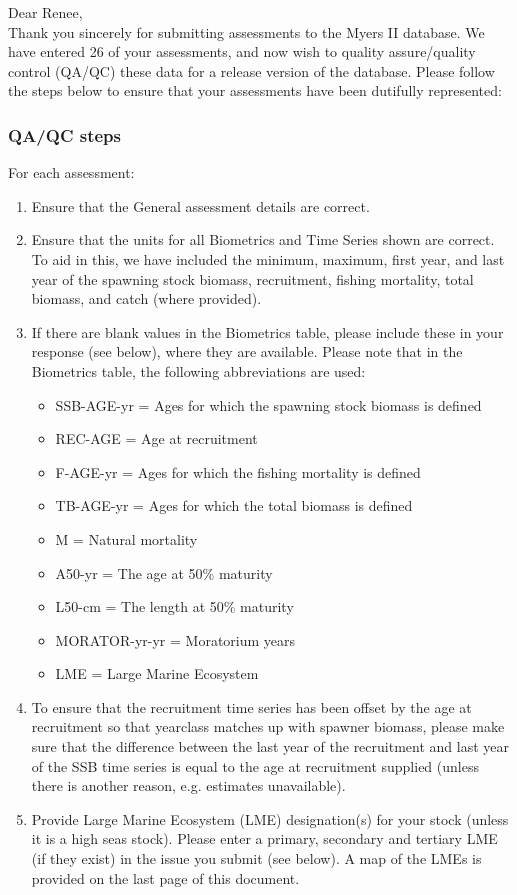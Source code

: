 \documentclass [a4paper, 10pt] {article}
\begin{document}
\noindent Dear Renee,\\

\noindent Thank you sincerely for submitting assessments to the Myers II database. We have entered 26 of your assessments, and now wish to quality assure/quality control (QA/QC) these data for a release version of the database. Please follow the steps below to ensure that your assessments have been dutifully represented:
\subsubsection{QA/QC steps}
For each assessment:
\begin{enumerate}
\item Ensure that the General assessment details are correct.
\item Ensure that the units for all Biometrics and Time Series shown are correct. To aid in this, we have included the minimum, maximum, first year, and last year of the spawning stock biomass, recruitment, fishing mortality, total biomass, and  catch  (where provided). 
\item If there are blank values in the Biometrics table, please include these in your response (see below), where they are available.
Please note that in the Biometrics table, the following abbreviations are used:
\begin{itemize}
\item SSB-AGE-yr  = Ages for which the spawning stock biomass is defined
\item REC-AGE     = Age at recruitment
\item F-AGE-yr    = Ages for which the fishing mortality is defined 
\item TB-AGE-yr   = Ages for which the total biomass is defined
\item M      = Natural mortality
\item A50-yr      = The age at 50\% maturity
\item L50-cm      = The length at 50\% maturity
\item MORATOR-yr-yr = Moratorium years
\item LME = Large Marine Ecosystem\\
\end{itemize}
\item To ensure that the recruitment time series has been offset by the age at recruitment so that yearclass matches up with spawner biomass, please make sure that the difference between the last year of the recruitment and last year of the SSB time series is equal to the age at recruitment supplied (unless there is another reason, e.g. estimates unavailable). 
\item Provide Large Marine Ecosystem (LME) designation(s) for your stock (unless it is a high seas stock). Please enter a primary, secondary and tertiary LME (if they exist) in the issue you submit (see below). A map of the LMEs is provided on the last page of this document. 
\end{enumerate}
\vspace{-.25in}
\end{document}
